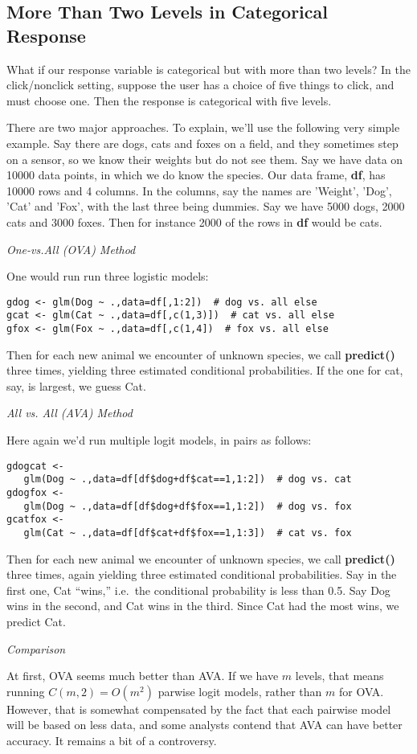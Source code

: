 \subsection{More Than Two Levels in Categorical Response}

What if our response variable is categorical but with more than two
levels?  In the click/nonclick setting, suppose the user has a choice of
five things to click, and must choose one.  Then the response is
categorical with five levels.  

There are two major approaches.  To explain, we'll use the following
very simple example. Say there are dogs, cats and foxes on a field, and
they sometimes step on a sensor, so we know their weights but do not see
them.  Say we have data on 10000 data points, in which we do know the
species.  Our data frame, \textbf{df}, has 10000 rows and 4 columns.  In
the columns, say the names are 'Weight', 'Dog', 'Cat' and 'Fox', with
the last three being dummies.  Say we have 5000 dogs, 2000 cats and 3000
foxes.  Then for instance 2000 of the rows in \textbf{df} would be cats.

\textit{One-vs.All (OVA) Method}

One would run run three logistic models:

\begin{lstlisting}
gdog <- glm(Dog ~ .,data=df[,1:2])  # dog vs. all else
gcat <- glm(Cat ~ .,data=df[,c(1,3)])  # cat vs. all else
gfox <- glm(Fox ~ .,data=df[,c(1,4])  # fox vs. all else
\end{lstlisting}

Then for each new animal we encounter of unknown species, we call
\textbf{predict()} three times, yielding three estimated conditional
probabilities.  If the one for cat, say, is largest, we guess Cat.

\textit{All vs. All (AVA) Method}

Here again we'd run multiple logit models, in pairs as follows:

\begin{lstlisting}
gdogcat <- 
   glm(Dog ~ .,data=df[df$dog+df$cat==1,1:2])  # dog vs. cat
gdogfox <- 
   glm(Dog ~ .,data=df[df$dog+df$fox==1,1:2])  # dog vs. fox
gcatfox <- 
   glm(Cat ~ .,data=df[df$cat+df$fox==1,1:3])  # cat vs. fox
\end{lstlisting}

Then for each new animal we encounter of unknown species, we call
\textbf{predict()} three times, again yielding three estimated
conditional probabilities.  Say in the first one, Cat ``wins,'' i.e.\
the conditional probability is less than 0.5.  Say Dog wins in the
second, and Cat wins in the third.  Since Cat had the most wins, we
predict Cat.

\textit{Comparison}

At first, OVA seems much better than AVA.  If we have $m$ levels, that
means running $C(m,2) = O(m^2)$ parwise logit models, rather than $m$
for OVA.  However, that is somewhat compensated by the fact that each
pairwise model will be based on less data, and some analysts contend
that AVA can have better accuracy.  It remains a bit of a controversy.


